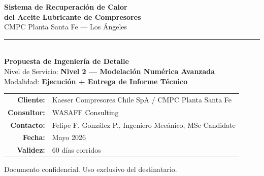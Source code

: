 \documentclass[11pt,a4paper]{article}
\begin{document}
\begin{titlepage}

\vspace*{5cm}

\begin{center}
{\Huge\bfseries\textcolor{wasaffblue}{Sistema de Recuperación de Calor}}\\[0.4cm]
{\Huge\bfseries\textcolor{wasaffblue}{del Aceite Lubricante de Compresores}}\\[0.4cm]
{\LARGE\textcolor{wasaffgray}{CMPC Planta Santa Fe — Los Ángeles}}\\[1.5cm]

\rule{0.6\textwidth}{1pt}\\[0.8cm]

{\Large\textbf{Propuesta de Ingeniería de Detalle}}\\[0.3cm]
{\large Nivel de Servicio: \textbf{Nivel 2 — Modelación Numérica Avanzada}}\\[0.3cm]
{\large Modalidad: \textbf{Ejecución + Entrega de Informe Técnico}}\\[1.5cm]

\begin{tabular}{rl}
\textbf{Cliente:} & Kaeser Compresores Chile SpA / CMPC Planta Santa Fe \\[0.3em]
\textbf{Consultor:} & WASAFF Consulting \\[0.3em]
\textbf{Contacto:} & Felipe F. González P., Ingeniero Mecánico, MSc Candidate \\[0.3em]
\textbf{Fecha:} & Mayo 2026 \\[0.3em]
\textbf{Validez:} & 60 días corridos \\
\end{tabular}

\vfill


\vspace{1cm}
{\small Documento confidencial. Uso exclusivo del destinatario.}
\end{center}
\end{titlepage}
\end{document}
